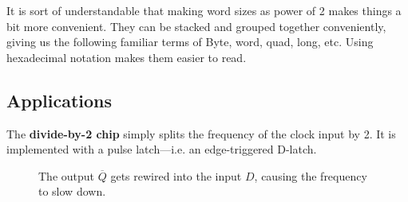   It is sort of understandable that making word sizes as power of 2 makes things a bit more convenient. They can be stacked and grouped together conveniently, giving us the following familiar terms of Byte, word, quad, long, etc. Using hexadecimal notation makes them easier to read. 

\subsection{Applications}
  
  \begin{definition}
    \label{def:divide-by-2-chip}
    The \textbf{divide-by-2 chip} simply splits the frequency of the clock input by 2. It is implemented with a pulse latch---i.e. an edge-triggered D-latch. 

    \begin{figure}[H]
      \centering 
      \caption{The output $\overline{Q}$ gets rewired into the input $D$, causing the frequency to slow down.}
    \end{figure}
  \end{definition}

